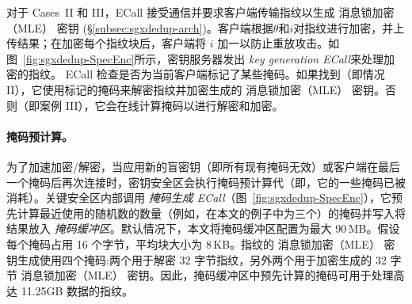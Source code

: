 对于 Cases~II 和 III，ECall 接受通信并要求客户端传输指纹以生成 消息锁加密（MLE） 密钥 (\S\ref{subsec:sgxdedup-arch})。客户端根据$\theta$和$i$对指纹进行加密，并上​​传结果；在加密每个指纹块后，客户端将 $i$ 加一以防止重放攻击。如图~\ref{fig:sgxdedup-SpecEnc}所示，密钥服务器发出\textit{ key generation ECall}来处理加密的指纹。 ECall 检查是否为当前客户端标记了某些掩码。如果找到（即情况 II），它使用标记的掩码来解密指纹并加密生成的 消息锁加密（MLE） 密钥。否则（即案例 III），它会在线计算掩码以进行解密和加密。

\paragraph*{掩码预计算。} 为了加速加密/解密，当应用新的盲密钥（即所有现有掩码无效）或客户端在最后一个掩码后再次连接时，密钥安全区会执行掩码预计算代（即，它的一些掩码已被消耗）。关键安全区内部调用 \textit{ 掩码生成 ECall}（图~\ref{fig:sgxdedup-SpecEnc}），它预先计算最近使用的随机数的数量（例如，在本文的例子中为三个）的掩码并写入将结果放入 \textit{ 掩码缓冲区}。默认情况下，本文将掩码缓冲区配置为最大 90\,MB。假设每个掩码占用 16 个字节，平均块大小为 8\,KB。指纹的 消息锁加密（MLE） 密钥生成使用四个掩码:两个用于解密 32 字节指纹，另外两个用于加密生成的 32 字节 消息锁加密（MLE） 密钥。因此，掩码缓冲区中预先计算的掩码可用于处理高达 11.25GB 数据的指纹。
